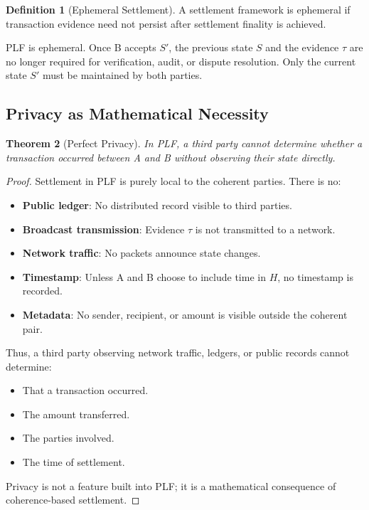 \documentclass[twocolumn,10pt,a4paper]{article}
\theoremstyle{plain}
\newtheorem{theorem}{Theorem}[section]
\theoremstyle{definition}
\newtheorem{definition}[theorem]{Definition}
\begin{document}
\begin{definition}[Ephemeral Settlement]
A settlement framework is ephemeral if transaction evidence need not persist after settlement finality is achieved.
\end{definition}

PLF is ephemeral. Once B accepts $S'$, the previous state $S$ and the evidence $\tau$ are no longer required for verification, audit, or dispute resolution. Only the current state $S'$ must be maintained by both parties.

\subsection{Privacy as Mathematical Necessity}

\begin{theorem}[Perfect Privacy]
In PLF, a third party cannot determine whether a transaction occurred between A and B without observing their state directly.
\end{theorem}

\begin{proof}
Settlement in PLF is purely local to the coherent parties. There is no:
\begin{itemize}
\item \textbf{Public ledger}: No distributed record visible to third parties.
\item \textbf{Broadcast transmission}: Evidence $\tau$ is not transmitted to a network.
\item \textbf{Network traffic}: No packets announce state changes.
\item \textbf{Timestamp}: Unless A and B choose to include time in $H$, no timestamp is recorded.
\item \textbf{Metadata}: No sender, recipient, or amount is visible outside the coherent pair.
\end{itemize}

Thus, a third party observing network traffic, ledgers, or public records cannot determine:
\begin{itemize}
\item That a transaction occurred.
\item The amount transferred.
\item The parties involved.
\item The time of settlement.
\end{itemize}

Privacy is not a feature built into PLF; it is a mathematical consequence of coherence-based settlement.
\end{proof}
\end{document}
